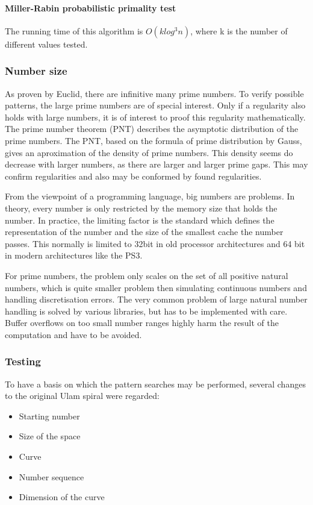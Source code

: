 \paragraph{Miller-Rabin probabilistic primality test}
The running time of this algorithm is $O(k log^{3} n)$, where k is the number of different values tested.


\subsubsection{Number size}
\label{sec:line_detection}
As proven by Euclid, there are infinitive many prime numbers. To verify possible patterns, the large prime numbers are of special interest. Only if a regularity also holds with large numbers, it is of interest to proof this regularity mathematically.
The prime number theorem (PNT) describes the asymptotic distribution of the prime numbers. The PNT, based on the formula of prime distribution by Gauss\cite{XXX}, gives an aproximation of the density of prime numbers. This density seems do decrease with larger numbers, as there are larger and larger prime gaps. This may confirm regularities and also may be conformed by found regularities.

From the viewpoint of a programming language, big numbers are problems. In theory, every number is only restricted by the memory size that holds the number. In practice, the limiting factor is the standard which defines the representation of the number and the size of the smallest cache the number passes. This normally is limited to 32bit in old processor architectures and 64 bit in modern architectures like the PS3.

For prime numbers, the problem only scales on the set of all positive natural numbers, which is quite smaller problem then simulating continuous numbers and handling discretisation errors. The  very common problem of large natural number handling is solved by various libraries, but has to be implemented with care. Buffer overflows on too small number ranges highly harm the result of the computation and have to be avoided.

\subsubsection{Testing}
\label{sec:tests}
To have a basis on which the pattern searches may be performed, several changes to the original Ulam spiral were regarded:

\begin{itemize}%
   \item Starting number
   \item Size of the space
   \item Curve
   \item Number sequence
   \item Dimension of the curve   
\end{itemize}%

